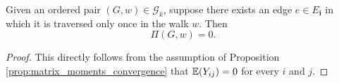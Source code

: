 

\begin{lemma}
  \label{lem:Pi.prod_eq_zero_if_w_le_two}
  Given an ordered pair $(G,w) \in \mathcal{G}_k$, suppose there exists an edge $e \in E_\mathbf{i}$ in which it is traversed only once in the walk $w$. Then
  \[
  \Pi (G,w) = 0.
  \]
\end{lemma}
\begin{proof}

This directly follows from the assumption of Proposition \ref{prop:matrix_moments_convergence} that $\mathbb{E} (Y_{ij}) = 0$ for every $i$ and $j$. 

\end{proof}


